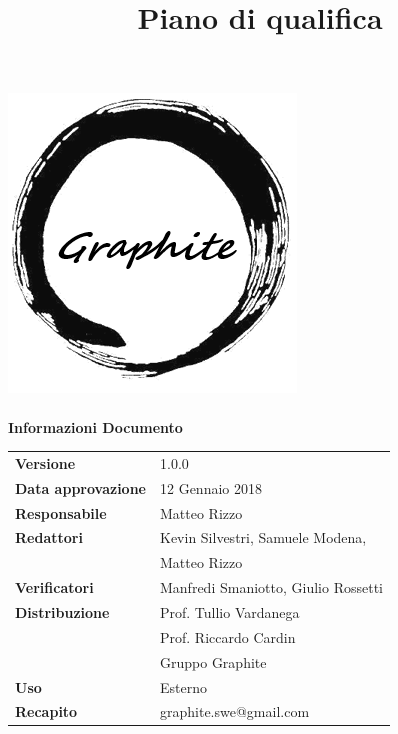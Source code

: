 \documentclass[openany,12pt,a4paper]{report}
\title{Piano di qualifica}
\author{}
\newcommand{\versione}{1.0.0}
\begin{document}
	\makeatletter
	\begin{titlepage}
		\setlength{\headsep}{0pt}  
		\begin{center}
			\includegraphics[width=0.5\linewidth]{img/logo.png}\\[1em]
			{\huge \bfseries  \@title }\\[10ex]
			\textbf{\Large Informazioni Documento} \\[2em]
			\bgroup
			\def\arraystretch{1.5}
			\begin{tabular}{l|l}
				\textbf{Versione} & \versione{} \\
				\textbf{Data approvazione} & 12 Gennaio 2018 \\
				\textbf{Responsabile} & Matteo Rizzo\\
				\textbf{Redattori} &  Kevin Silvestri, Samuele Modena,\\
				& Matteo Rizzo \\
				\textbf{Verificatori} & Manfredi Smaniotto, Giulio Rossetti \\
				\textbf{Distribuzione} & Prof. Tullio Vardanega \\
				 & Prof. Riccardo Cardin \\
				 & Gruppo Graphite \\
				\textbf{Uso} & Esterno \\
				\textbf{Recapito} & graphite.swe@gmail.com \\
			\end{tabular}
		\egroup
		\end{center}
	\end{titlepage}
	\makeatother
 
\thispagestyle{empty}
\newpage

\end{document}

